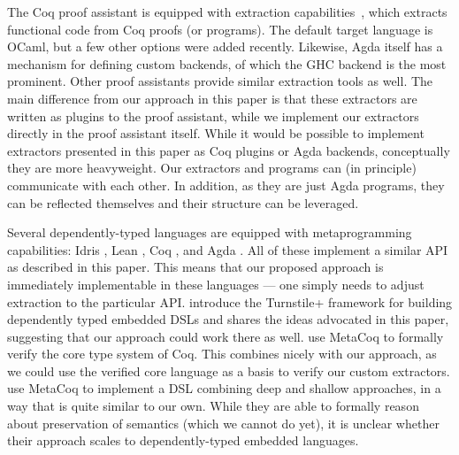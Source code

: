 \documentclass[sigplan,screen]{acmart}
\renewcommand\paragraph{\noindentparagraph}
\begin{document}
The Coq proof assistant is equipped with extraction
capabilities~\cite{10.1007/978-3-540-69407-6_39,10.1007/3-540-39185-1_12},
which extracts functional code from Coq proofs (or programs).  The
default target language is OCaml, but a few other options were added
recently.
%
Likewise, Agda itself has a mechanism for defining custom backends, of
which the GHC backend is the most prominent.
%
Other proof assistants provide similar extraction tools as well.
%
The main difference from our approach in this paper
is that these extractors are written as plugins to the proof
assistant, while we implement our extractors directly in the proof
assistant itself.
%
While it would be possible to implement extractors presented in this
paper as Coq plugins or Agda backends, conceptually they are more
heavyweight.  Our extractors and programs can (in principle)
communicate with each other. In addition, as they are just Agda programs, they can
be reflected themselves and their structure can be leveraged.


Several dependently-typed languages are equipped with metaprogramming
capabilities: Idris \cite{idris-refl}, Lean \cite{lean-refl},
Coq \cite{metacoq}, and Agda \cite{agda-refl}.  All of these
implement a similar API as described in this paper.  This
means that our proposed approach is immediately implementable
in these languages --- one simply needs to adjust extraction
to the particular API.
\citet{10.1145/3371071} introduce the Turnstile+ framework for
building dependently typed embedded DSLs and
shares the ideas advocated in this paper, suggesting that
our approach could work there as well.
\citet{10.1145/3371076} use MetaCoq to formally verify
the core type system of Coq. This combines nicely with
our approach, as we could use the verified core language
as a basis to verify our custom extractors.
\citet{10.1145/3372885.3373829} use MetaCoq to implement
a DSL combining deep and shallow approaches, in a way that
is quite similar to our own. While they are able to formally
reason about preservation of semantics (which we cannot do yet), it is unclear
whether their approach scales to dependently-typed embedded languages.
\end{document}
